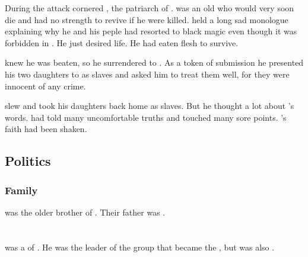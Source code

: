 During the attack \Damiarch cornered , the patriarch of \Sherem. 
\Monara was an old \resphan who would very soon die and had no strength to revive if he were killed. 
\Monara held a long sad monologue explaining why he and his peple had resorted to black magic even though it was forbidden in \Merkyrah.
He just desired life. 
He had eaten \resphan flesh to survive. 

\Monara knew he was beaten, so he surrendered to \Damiarch. 
As a token of submission he presented his two daughters to \Damiarch as slaves and asked him to treat them well, for they were innocent of any crime. 

\Damiarch slew \Monara and took his daughters back home as slaves.
But he thought a lot about \Monara's words. 
\Monara had told many uncomfortable truths and touched many sore points. 
\Damiarch's faith had been shaken. 









\subsection{Politics}





\subsubsection{Family}
\Damiarch was the older brother of . 
Their father was . 















\section{\Dolsharra}
\index{\Dolsharra}
\Dolsharra was a \thelyad \resphan of \Merkyrah.
He was the leader of the group that became the , but was also .















